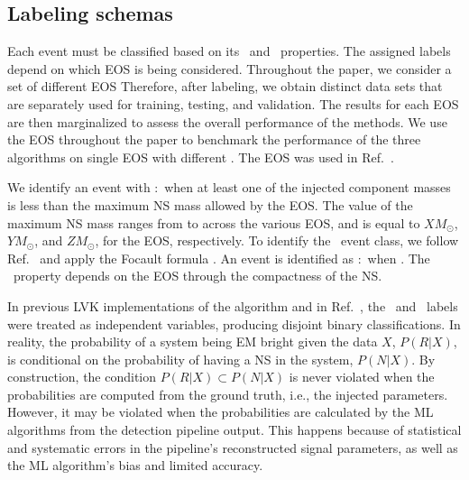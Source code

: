 \subsection*{Labeling schemas}


Each event must be classified based on its \hasns\ and \hasrem\ properties. The assigned labels depend on which \ac{EOS} is being considered. Throughout the paper, we consider a set of
 different EOS   Therefore, after labeling, we obtain  distinct data sets that are separately used
for training, testing, and validation. The results for each \ac{EOS} are then marginalized to assess the overall performance of the methods. We use the  \ac{EOS}
throughout the paper to benchmark the performance of the three algorithms on single \ac{EOS} with different . The  \ac{EOS} was used in
Ref.\ .


We identify an event with \hasns:\true\ when at least one of the injected component masses is less than the maximum \ac{NS} mass allowed by the \ac{EOS}. The value of the maximum
\ac{NS} mass ranges from  to  across the various \ac{EOS}, and is equal to $XM_\odot$, $YM_\odot$, and $ZM_\odot$, for the  \ac{EOS}, respectively. To
identify the \hasrem\ event class, we follow Ref.\  and apply the Focault formula . An event is identified as \hasrem:\true\ when .
The \hasrem\ property depends on the \ac{EOS} through the compactness of the \ac{NS}.

In previous \ac{LVK} implementations of the algorithm and in Ref.\ , the \hasns\ and \hasrem\ labels were treated as independent variables, producing disjoint
binary classifications. In reality, the probability of a system being \ac{EM} bright given the data $X$, $P(R|X)$, is conditional on the probability of having a \ac{NS} in the system,
$P(N|X)$. By construction, the condition $P(R|X)\subset P(N|X)$ is never violated when the probabilities are computed from the ground truth, i.e., the injected parameters. However, it
may be violated when the probabilities are calculated by the \ac{ML} algorithms from the detection pipeline output. This happens because of statistical and systematic errors in the
pipeline's reconstructed signal parameters, as well as the \ac{ML} algorithm's bias and limited accuracy. 

